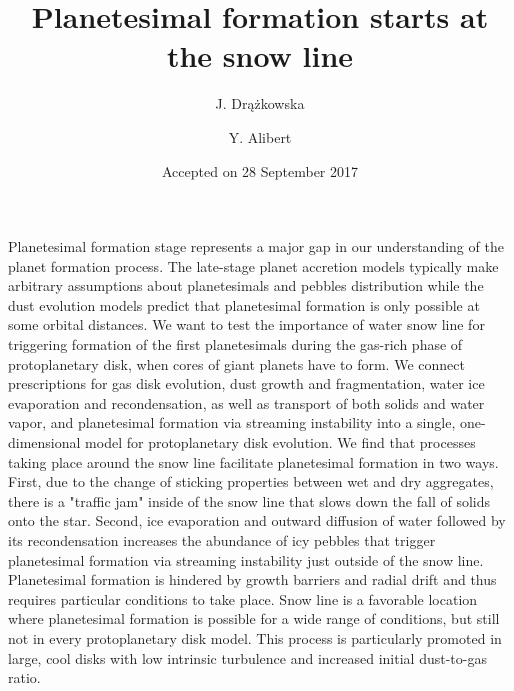 \documentclass{aa}
\begin{document}
 


   \title{Planetesimal formation starts at the snow line}

   \subtitle{}

   \author{J. Dr{\k a}{\. z}kowska
          \and
          Y. Alibert
          }


   \date{Accepted on 28 September 2017}

 
  \abstract
   {Planetesimal formation stage represents a major gap in our understanding of the planet formation process. The late-stage planet accretion models typically make arbitrary assumptions about planetesimals and pebbles distribution while the dust evolution models predict that planetesimal formation is only possible at some orbital distances. }
   {We want to test the importance of water snow line for triggering formation of the first planetesimals during the gas-rich phase of protoplanetary disk, when cores of giant planets have to form.}
   {We connect prescriptions for gas disk evolution, dust growth and fragmentation, water ice evaporation and recondensation, as well as transport of both solids and water vapor, and planetesimal formation via streaming instability into a single, one-dimensional model for protoplanetary disk evolution.}
   {We find that processes taking place around the snow line facilitate planetesimal formation in two ways. First, due to the change of sticking properties between wet and dry aggregates, there is a "traffic jam" inside of the snow line that slows down the fall of solids onto the star. Second, ice evaporation and outward diffusion of water followed by its recondensation increases the abundance of icy pebbles that trigger planetesimal formation via streaming instability just outside of the snow line.}
   {Planetesimal formation is hindered by growth barriers and radial drift and thus requires particular conditions to take place. Snow line is a favorable location where planetesimal formation is possible for a wide range of conditions, but still not in every protoplanetary disk model. This process is particularly promoted in large, cool disks with low intrinsic turbulence and increased initial dust-to-gas ratio.}
   {}  
\end{document}
